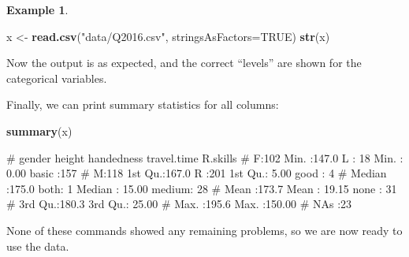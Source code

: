 \documentclass[
  a4paper,
]{article}
\newenvironment{Shaded}{\begin{snugshade}}{\end{snugshade}}
\newcommand{\AttributeTok}[1]{\textcolor[rgb]{0.13,0.29,0.53}{#1}}
\newcommand{\ConstantTok}[1]{\textcolor[rgb]{0.56,0.35,0.01}{#1}}
\newcommand{\FunctionTok}[1]{\textcolor[rgb]{0.13,0.29,0.53}{\textbf{#1}}}
\newcommand{\NormalTok}[1]{#1}
\newcommand{\OtherTok}[1]{\textcolor[rgb]{0.56,0.35,0.01}{#1}}
\newcommand{\StringTok}[1]{\textcolor[rgb]{0.31,0.60,0.02}{#1}}
\theoremstyle{definition}
\theoremstyle{definition}
\newtheorem{example}{Example}[section]
\theoremstyle{definition}
\theoremstyle{definition}
\theoremstyle{remark}
\begin{document}
\begin{example}
\begin{Shaded}
\begin{Highlighting}[]
\NormalTok{x }\OtherTok{\textless{}{-}} \FunctionTok{read.csv}\NormalTok{(}\StringTok{"data/Q2016.csv"}\NormalTok{, }\AttributeTok{stringsAsFactors=}\ConstantTok{TRUE}\NormalTok{)}
\FunctionTok{str}\NormalTok{(x)}
\end{Highlighting}
\end{Shaded}

\begin{Shaded}
\end{Shaded}

Now the output is as expected, and the correct ``levels'' are shown
for the categorical variables.

Finally, we can print summary statistics for all columns:

\begin{Shaded}
\begin{Highlighting}[]
\FunctionTok{summary}\NormalTok{(x)}
\end{Highlighting}
\end{Shaded}

\begin{Shaded}
\begin{Highlighting}[]
\NormalTok{\#  gender      height      handedness  travel.time       R.skills  }
\NormalTok{\#  F:102   Min.   :147.0   L   : 18   Min.   :  0.00   basic :157  }
\NormalTok{\#  M:118   1st Qu.:167.0   R   :201   1st Qu.:  5.00   good  :  4  }
\NormalTok{\#          Median :175.0   both:  1   Median : 15.00   medium: 28  }
\NormalTok{\#          Mean   :173.7              Mean   : 19.15   none  : 31  }
\NormalTok{\#          3rd Qu.:180.3              3rd Qu.: 25.00               }
\NormalTok{\#          Max.   :195.6              Max.   :150.00               }
\NormalTok{\#          NA\textquotesingle{}s   :23}
\end{Highlighting}
\end{Shaded}

None of these commands showed any remaining problems, so we are now ready
to use the data.
\end{example}
\end{document}
